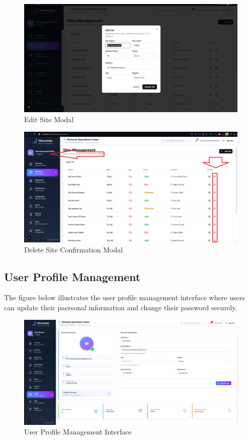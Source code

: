 \begin{figure}[H]
    \centering
    \includegraphics[width=0.9\linewidth]{img/chap_03/edit_site_modal.png}
    \caption{Edit Site Modal}
    \label{fig:edit_site_modal}
\end{figure}

\begin{figure}[H]
    \centering
    \includegraphics[width=0.9\linewidth]{img/chap_03/delete_site_modal.png}
    \caption{Delete Site Confirmation Modal}
    \label{fig:delete_site_modal}
\end{figure}

\subsection{User Profile Management}

The figure below illustrates the user profile management interface where users can update their paersonal information and change their password securely.

\begin{figure}[H]
    \centering
    \includegraphics[width=0.9\linewidth]{img/chap_03/profile_management.png}
    \caption{User Profile Management Interface}
    \label{fig:profile_management}
\end{figure}

